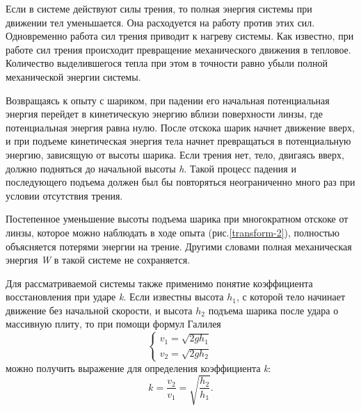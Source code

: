 \documentclass[14pt,a4paper,oneside]{extarticle}	%
\begin{document}
Если в системе действуют силы трения, то полная энергия системы при движении тел уменьшается.
Она расходуется на работу против этих сил.
Одновременно работа сил трения приводит к нагреву системы.
Как известно, при работе сил трения происходит превращение механического движения в тепловое.
Количество выделившегося тепла при этом в точности равно убыли полной механической энергии системы. 

Возвращаясь к опыту с шариком, при падении его начальная потенциальная энергия перейдет в кинетическую 
энергию вблизи поверхности линзы, где потенциальная энергия равна нулю.
После отскока шарик начнет движение вверх, и при подъеме кинетическая энергия тела начнет 
превращаться в потенциальную энергию, зависящую от высоты шарика.
Если трения нет, тело, двигаясь вверх, 
должно подняться до начальной высоты \textit{h}.
Такой процесс падения и последующего подъема должен был бы повторяться неограниченно много раз при условии отсутствия трения. 

Постепенное уменьшение высоты подъема шарика при многократном отскоке от линзы, которое можно 
наблюдать в ходе опыта (рис.\ref{transform-2}), полностью объясняется потерями энергии на 
трение.
Другими словами полная механическая энергия \textit{W} в такой системе не сохраняется.

Для рассматриваемой системы также применимо понятие коэффициента восстановления при ударе \textit{k}.
Если известны высота $ h_1 $, с которой тело начинает движение без начальной скорости, и высота $ h_2 $ подъема шарика после удара о массивную плиту, то при помощи формул Галилея
\begin{equation}
\begin{cases}
v_1=\sqrt{2gh_1} \\
v_2=\sqrt{2gh_2}
\end{cases}
\end{equation}
можно получить выражение для определения коэффициента \textit{k}:
\begin{equation}
k=\dfrac{v_2}{v_1}=\sqrt{\dfrac{h_2}{h_1}}.
\end{equation}
\end{document}
